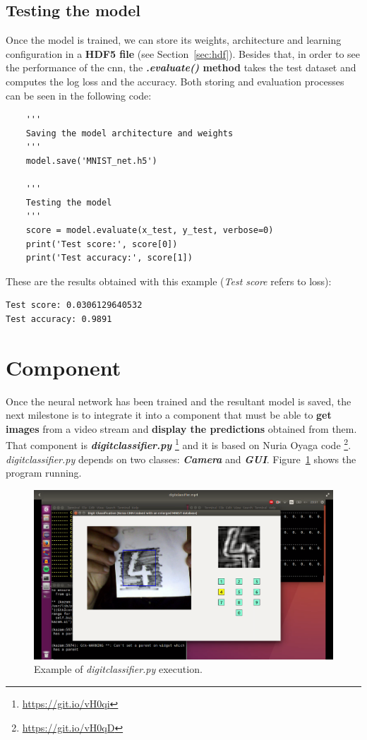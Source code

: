 \subsection{Testing the model}
Once the model is trained, we can store its weights, architecture and learning configuration in a \textbf{HDF5 file} (see Section~\ref{sec:hdf}). Besides that, in order to see the performance of the \gls{cnn}, the \textbf{\textit{.evaluate()} method} takes the test dataset and computes the log loss and the accuracy. Both storing and evaluation processes can be seen in the following code:
\begin{lstlisting}
    '''
    Saving the model architecture and weights
    '''
    model.save('MNIST_net.h5')
    
    '''
    Testing the model
    '''
    score = model.evaluate(x_test, y_test, verbose=0)
    print('Test score:', score[0])
    print('Test accuracy:', score[1])
\end{lstlisting}
These are the results obtained with this example (\textit{Test score} refers to loss):
\begin{Verbatim}[frame=single]
Test score: 0.0306129640532
Test accuracy: 0.9891
\end{Verbatim}

\section{Component}\label{sec:component}
Once the neural network has been trained and the resultant model is saved, the next milestone is to integrate it into a component that must be able to \textbf{get images} from a video stream and \textbf{display the predictions} obtained from them. That component is \textbf{\textit{digitclassifier.py}} \footnote{\url{https://git.io/vH0qi}} and it is based on Nuria Oyaga code \footnote{\url{https://git.io/vH0qD}}. \textit{digitclassifier.py} depends on two classes: \textbf{\textit{Camera}} and \textbf{\textit{GUI}}. Figure~\ref{fig:digitclass} shows the program running.

\begin{figure}
	\centering
	\includegraphics[width=1\linewidth, keepaspectratio]{figures/digitclass.png}
	\caption{Example of \textit{digitclassifier.py} execution.}
	\label{fig:digitclass}
\end{figure}

